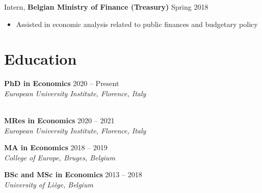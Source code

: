 \documentclass[10pt, a4paper]{article}
\begin{document}
\quad Intern, \textbf{Belgian Ministry of Finance (Treasury)} \hfill Spring 2018
\begin{itemize}[noitemsep, topsep=0pt, before = \vspace{.2em}, after=\vspace{0.5em}]
  \item Assisted in economic analysis related to public finances and budgetary policy
\end{itemize}


\section{Education}
\vspace{.5em}

\quad \textbf{PhD in Economics} \hfill 2020 -- Present \\
\quad \emph{European University Institute, Florence, Italy} \\
 \\
\vspace{0.6em}

\quad \textbf{MRes in Economics} \hfill 2020 -- 2021 \\
\quad \emph{European University Institute, Florence, Italy}
\quad \vspace{0.6em}

\quad \textbf{MA in Economics} \hfill 2018 -- 2019 \\
\quad \emph{College of Europe, Bruges, Belgium}
\quad \vspace{0.6em}

\quad \textbf{BSc and MSc in Economics} \hfill 2013 -- 2018 \\
\quad \emph{University of Liège, Belgium}


\end{document}
